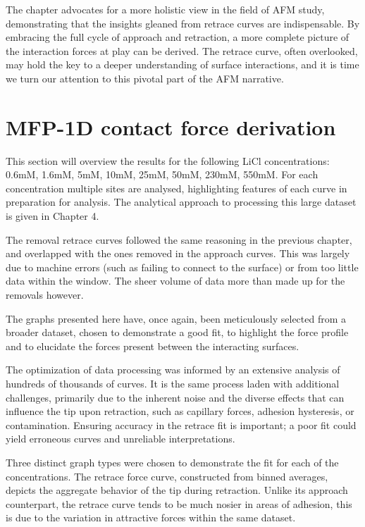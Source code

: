 The chapter advocates for a more holistic view in the field of AFM study, demonstrating that the insights gleaned from retrace curves are indispensable. By embracing the full cycle of approach and retraction, a more complete picture of the interaction forces at play can be derived. The retrace curve, often overlooked, may hold the key to a deeper understanding of surface interactions, and it is time we turn our attention to this pivotal part of the AFM narrative.

\section{MFP-1D contact force derivation}

This section will overview the results for the following LiCl concentrations: 0.6mM, 1.6mM, 5mM, 10mM, 25mM, 50mM, 230mM, 550mM. For each concentration multiple sites are analysed, highlighting features of each curve in preparation for analysis. The analytical approach to processing this large dataset is given in Chapter 4. 

The removal retrace curves followed the same reasoning in the previous chapter, and overlapped with the ones removed in the approach curves. This was largely due to machine errors (such as failing to connect to the surface) or from too little data within the window. The sheer volume of data more than made up for the removals however.

The graphs presented here have, once again, been meticulously selected from a broader dataset, chosen to demonstrate a good fit, to highlight the force profile and to elucidate the forces present between the interacting surfaces.

The optimization of data processing was informed by an extensive analysis of hundreds of thousands of curves. It is the same process laden with additional challenges, primarily due to the inherent noise and the diverse effects that can influence the tip upon retraction, such as capillary forces, adhesion hysteresis, or contamination. Ensuring accuracy in the retrace fit is important; a poor fit could yield erroneous curves and unreliable interpretations.

Three distinct graph types were chosen to demonstrate the fit for each of the concentrations. The retrace force curve, constructed from binned averages, depicts the aggregate behavior of the tip during retraction. Unlike its approach counterpart, the retrace curve tends to be much nosier in areas of adhesion, this is due to the variation in attractive forces within the same dataset.

